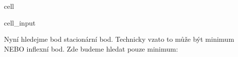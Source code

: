 \documentclass[letterpaper,10pt,english]{jupyterBook}
\begin{document}
\begin{sphinxuseclass}{cell}\begin{sphinxVerbatimInput}

\begin{sphinxuseclass}{cell_input}
\begin{sphinxVerbatim}[commandchars=\\\{\}]
    
      
      
      
  
  
      \PYG{p}{[}\PYG{p}{]}  \PYG{p}{[}\PYG{p}{]}  
      \PYG{p}{[} \PYG{p}{[}\PYG{p}{]}\PYG{p}{]} 
        
     
\end{sphinxVerbatim}

\end{sphinxuseclass}\end{sphinxVerbatimInput}

\end{sphinxuseclass}
\sphinxAtStartPar
Nyní hledejme bod stacionární bod. Technicky vzato to může být minimum NEBO inflexní bod. Zde budeme hledat pouze minimum:
\end{document}
